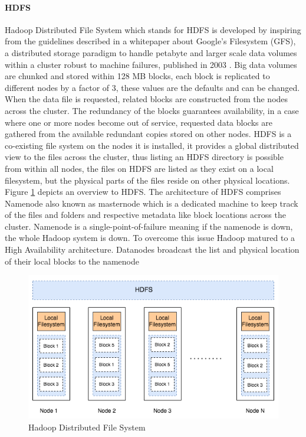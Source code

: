 \documentclass[review]{elsarticle}
\begin{document}
\paragraph{HDFS}Hadoop Distributed File System which stands for HDFS is developed by inspiring from the guidelines described in a whitepaper about Google's Filesystem (GFS), a distributed storage paradigm to handle petabyte and larger scale data volumes within a cluster robust to machine failures, published in 2003 \cite{ghemawat_google_2003}. Big data volumes are chunked and stored within 128 MB blocks, each block is replicated to different nodes by a factor of 3, these values are the defaults and can be changed. When the data file is requested, related blocks are constructed from the nodes across the cluster. The redundancy of the blocks guarantees availability, in a case where one or more nodes become out of service, requested data blocks are gathered from the available redundant copies stored on other nodes. HDFS is a co-existing file system on the nodes it is installed, it provides a global distributed view to the files across the cluster, thus listing an HDFS directory is possible from within all nodes, the files on HDFS are listed as they exist on a local filesystem, but the physical parts of the files reside on other physical locations. Figure \ref{fig:HDFSoverview} depicts an overview to HDFS. The architecture of HDFS comprises Namenode also known as masternode which is a dedicated machine to keep track of the files and folders and respective metadata like block locations across the cluster. Namenode is a single-point-of-failure meaning if the namenode is down, the whole Hadoop system is down. To overcome this issue Hadoop matured to a High Availability architecture.
Datanodes broadcast the list and physical location of their local blocks to the namenode


\begin{figure}[h!]
	\includegraphics[width=\textwidth]{HDFSoverview}
	\caption{Hadoop Distributed File System}
	\label{fig:HDFSoverview}
	\centering
\end{figure}
\end{document}
